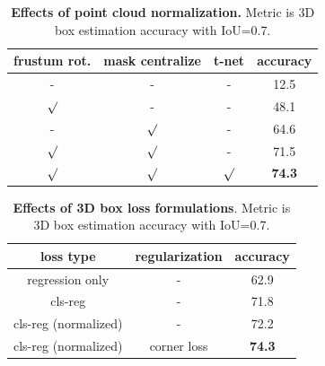 
\begin{table}[t!]
\small
\centering
\begin{tabular}{c|c|c|c}
\hline
frustum rot. & mask centralize & t-net & accuracy \\ \hline
- & - & - & 12.5 \\
$\surd$ & - & - & 48.1         \\
- & $\surd$ & - & 64.6         \\
$\surd$ & $\surd$ & -& 71.5         \\
$\surd$ & $\surd$ & $\surd$ & \textbf{74.3}         \\ \hline
\end{tabular}
\caption{\textbf{Effects of point cloud normalization.} Metric is 3D box estimation accuracy with IoU=0.7.}
\label{tab:pc_normalization}
\end{table}


\begin{table}[t!]
\small
\centering
\begin{tabular}{c|c|c}
\hline
loss type & regularization & accuracy \\ \hline
regression only & - & 62.9 \\ \hline
cls-reg & - & 71.8    \\ 
cls-reg (normalized) & - & 72.2    \\ \hline
cls-reg (normalized)  & corner loss & \textbf{74.3}  \\ \hline
\end{tabular}
\caption{\textbf{Effects of 3D box loss formulations}. Metric is 3D box estimation accuracy with IoU=0.7.}
\label{tab:corner_loss}

\end{table}

